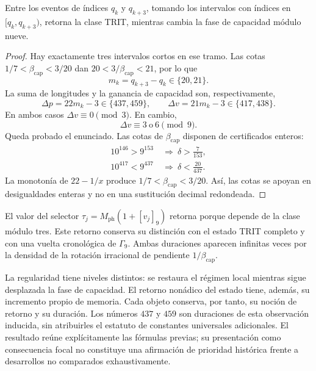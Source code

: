 \begin{proposition}
\label{md:restop:proposicion-regimen}
Entre los eventos de índices $q_k$ y $q_{k+3}$, tomando los intervalos con
índices en $[q_k,q_{k+3})$, retorna la clase TRIT, mientras cambia la fase
de capacidad módulo nueve.
\end{proposition}
\begin{proof}
Hay exactamente tres intervalos cortos en ese tramo.
Las cotas $1/7<\beta_{\mathrm{cap}}<3/20$ dan
$20<3/\beta_{\mathrm{cap}}<21$, por lo que
\begin{equation}
 m_k=q_{k+3}-q_k\in\{20,21\}.
 \label{md:restop:duracion-tritica}
\end{equation}
La suma de longitudes y la ganancia de capacidad son, respectivamente,
\begin{equation}
 \Delta p=22m_k-3\in\{437,459\},\qquad
 \Delta v=21m_k-3\in\{417,438\}.
 \label{md:restop:ganancias}
\end{equation}
En ambos casos $\Delta v\equiv0\pmod3$. En cambio,
\begin{equation}
 \boxed{\Delta v\equiv3\ \text{o}\ 6\pmod9.}
 \label{md:restop:desplazamiento-nonadico}
\end{equation}
Queda probado el enunciado.
Las cotas de $\beta_{\mathrm{cap}}$ disponen de certificados enteros:
\begin{equation}
 \begin{aligned}
 10^{146}>9^{153}&\ \Longrightarrow\
 \delta>\frac7{153},\\
 10^{417}<9^{437}&\ \Longrightarrow\
 \delta<\frac{20}{437}.
 \end{aligned}
 \label{md:restop:certificados-cotas}
\end{equation}
La monotonía de $22-1/x$ produce
$1/7<\beta_{\mathrm{cap}}<3/20$. Así, las cotas se apoyan en
desigualdades enteras y no en una sustitución decimal redondeada.
\end{proof}

El valor del selector
$\tau_j=M_{\mathrm{ph}}(1+[v_j]_9)$ retorna porque depende de la clase
módulo tres. Este retorno conserva su distinción con el estado TRIT
completo y con una vuelta cronológica de $\Gamma_9$.
Ambas duraciones aparecen infinitas veces por la densidad de la rotación
irracional de pendiente $1/\beta_{\mathrm{cap}}$.

La regularidad tiene niveles distintos: se restaura el régimen local
mientras sigue desplazada la fase de capacidad. El retorno nonádico del
estado tiene, además, su incremento propio de memoria. Cada objeto
conserva, por tanto, su noción de retorno y su duración.
Los números $437$ y $459$ son duraciones de esta observación inducida,
sin atribuirles el estatuto de constantes universales adicionales.
El resultado reúne explícitamente las fórmulas previas; su presentación
como consecuencia focal no constituye una afirmación de prioridad
histórica frente a desarrollos no comparados exhaustivamente.

